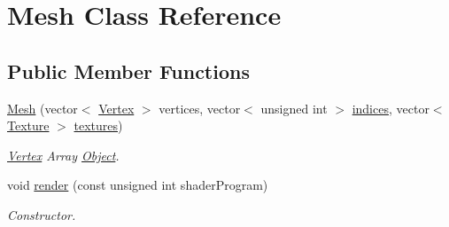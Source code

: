 \hypertarget{class_mesh}{\section{Mesh Class Reference}
\label{class_mesh}
}
\subsection*{Public Member Functions}
\begin{DoxyCompactItemize}
\item 
\hypertarget{class_mesh_a2d6c71adb66e5f270cee7a60c4e23018}{\hyperlink{class_mesh_a2d6c71adb66e5f270cee7a60c4e23018}{Mesh} (vector$<$ \hyperlink{struct_vertex}{Vertex} $>$ vertices, vector$<$ unsigned int $>$ \hyperlink{class_mesh_a464d9a1d7e7a4f67321dffc1e8b44b7d}{indices}, vector$<$ \hyperlink{struct_texture}{Texture} $>$ \hyperlink{class_mesh_a09bf4e8307bf7717c56501ca6293c6c0}{textures})}\label{class_mesh_a2d6c71adb66e5f270cee7a60c4e23018}

\begin{DoxyCompactList}\small\item\em \hyperlink{struct_vertex}{Vertex} Array \hyperlink{class_object}{Object}. \end{DoxyCompactList}\item 
\hypertarget{class_mesh_a9a6ec018bec776cb7b31fb8433c8a7e7}{void \hyperlink{class_mesh_a9a6ec018bec776cb7b31fb8433c8a7e7}{render} (const unsigned int shader\+Program)}\label{class_mesh_a9a6ec018bec776cb7b31fb8433c8a7e7}

\begin{DoxyCompactList}\small\item\em Constructor. \end{DoxyCompactList}\end{DoxyCompactItemize}
